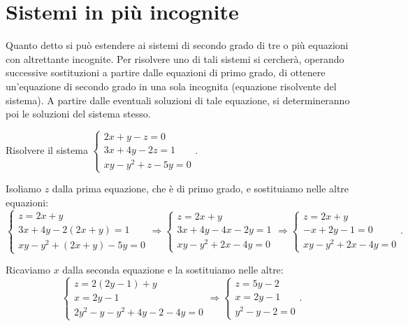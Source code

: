 \ovalbox{\risolvii \ref{ese:6.16}, \ref{ese:6.17}, \ref{ese:6.18}, \ref{ese:6.19}}

\section{Sistemi in più incognite}

Quanto detto si può estendere ai sistemi di secondo grado di tre o più equazioni con altrettante incognite. Per risolvere uno di tali sistemi si cercherà, operando successive sostituzioni a partire dalle equazioni di primo grado, di ottenere un'equazione di secondo grado in una sola incognita (equazione risolvente del sistema).
A partire dalle eventuali soluzioni di tale equazione, si determineranno poi le soluzioni del sistema stesso.
\begin{exrig}
\begin{esempio}
Risolvere il sistema $\left\{\begin{array}{l}2x+y-z=0\\3x+4y-2z=1\\xy-y^2+z-5y=0\end{array}\right.$.

Isoliamo $z$ dalla prima equazione, che è di primo grado, e sostituiamo nelle altre equazioni:
\[ \left\{\begin{array}{l}z=2x+y\\
3x+4y-2(2x+y)=1\\
{xy}-y^2+(2x+y)-5y=0\end{array}\right. \Rightarrow\left\{\begin{array}{l}z=2x+y\\
3x+4y-4x-2y=1\\
xy-y^2+2x-4y=0\end{array}\right. \Rightarrow\left\{\begin{array}{l}z=2x+y\\
-x+2y-1=0\\
xy-y^2+2x-4y=0\end{array}\right..\]

Ricaviamo $x$ dalla seconda equazione e la sostituiamo nelle altre:
\[ \left\{\begin{array}{l}z=2(2y-1)+y\\
x=2y-1\\
2y^2-y-y^2+4y-2-4y=0\end{array}\right. \Rightarrow\left\{\begin{array}{l}z=5y-2\\
x=2y-1\\
y^2-y-2=0\end{array}\right..\]


\end{esempio}
\end{exrig}
